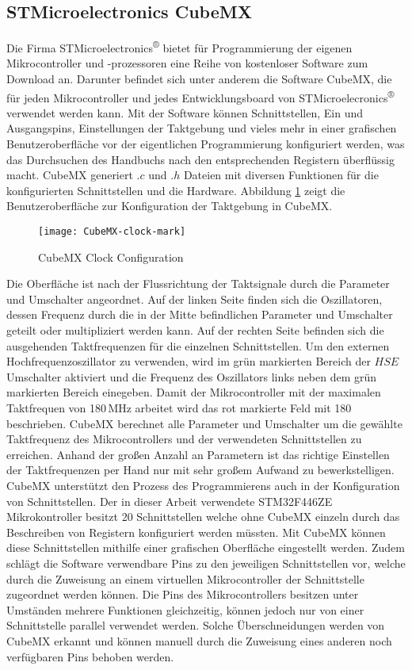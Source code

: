 
\subsection{STMicroelectronics CubeMX}
Die Firma STMicroelectronics\textsuperscript{®} bietet für Programmierung der eigenen Mikrocontroller und -prozessoren eine Reihe von kostenloser Software zum Download an. Darunter befindet sich unter anderem die Software CubeMX, die für jeden Mikrocontroller und jedes Entwicklungsboard von STMicroelecronics\textsuperscript{®} verwendet werden kann. Mit der Software können Schnittstellen, Ein und Ausgangspins, Einstellungen der Taktgebung und vieles mehr in einer grafischen Benutzeroberfläche vor der eigentlichen Programmierung konfiguriert werden, was das Durchsuchen des Handbuchs nach den entsprechenden Registern überflüssig macht. CubeMX generiert $.c$ und $.h$ Dateien mit diversen Funktionen für die konfigurierten Schnittstellen und die Hardware. 
Abbildung \ref{fig:CubeMXClock} zeigt die Benutzeroberfläche zur Konfiguration der Taktgebung in CubeMX. 
\begin{figure}[h]
	\centering
	\texttt{[image: CubeMX-clock-mark]}
	\caption{CubeMX Clock Configuration}
	\label{fig:CubeMXClock}
\end{figure}
Die Oberfläche ist nach der Flussrichtung der Taktsignale durch die Parameter und Umschalter angeordnet. Auf der linken Seite finden sich die Oszillatoren, dessen Frequenz durch die in der Mitte befindlichen Parameter und Umschalter geteilt oder multipliziert werden kann. Auf der rechten Seite befinden sich die ausgehenden Taktfrequenzen für die einzelnen Schnittstellen. Um den externen Hochfrequenzoszillator zu verwenden, wird im grün markierten Bereich der $HSE$ Umschalter aktiviert und die Frequenz des Oszillators links neben dem grün markierten Bereich einegeben. Damit der Mikrocontroller mit der maximalen Taktfrequen von 180\,MHz arbeitet wird das rot markierte Feld mit 180 beschrieben. CubeMX berechnet alle Parameter und Umschalter um die gewählte Taktfrequenz des Mikrocontrollers und der verwendeten Schnittstellen zu erreichen. Anhand der großen Anzahl an Parametern ist das richtige Einstellen der Taktfrequenzen per Hand nur mit sehr großem Aufwand zu bewerkstelligen. CubeMX unterstützt den Prozess des Programmierens auch in der Konfiguration von Schnittstellen. Der in dieser Arbeit verwendete STM32F446ZE Mikrokontroller besitzt 20 Schnittstellen welche ohne CubeMX einzeln durch das Beschreiben von Registern konfiguriert werden müssten. Mit CubeMX können diese Schnittstellen mithilfe einer grafischen Oberfläche eingestellt werden. Zudem schlägt die Software verwendbare Pins zu den jeweiligen Schnittstellen vor, welche durch die Zuweisung an einem virtuellen Mikrocontroller der Schnittstelle zugeordnet werden können. Die Pins des Mikrocontrollers besitzen unter Umständen mehrere Funktionen gleichzeitig, können jedoch nur von einer Schnittstelle parallel verwendet werden. Solche Überschneidungen werden von CubeMX erkannt und können manuell durch die Zuweisung eines anderen noch verfügbaren Pins behoben werden.
